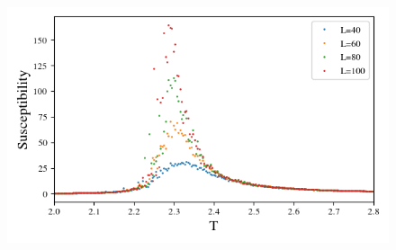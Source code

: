 \begin{figure}[H]
  \centering
  \includegraphics[width=\textwidth]{../figures/phase_suscept.png}
  \caption{}
  \label{fig:phase_suscept}
\end{figure}
